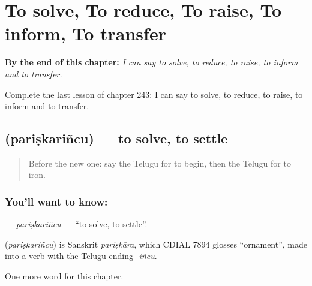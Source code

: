 
\chapter{To solve, To reduce, To raise, To inform, To transfer}
\label{ch:te-to-solve-to-reduce-to-raise-to-inform-to-transfer}

\begin{chapteropening}
\textbf{By the end of this chapter:} \emph{I can say to solve, to reduce, to raise, to inform and to transfer.}

Complete the last lesson of chapter 243: I can say to solve, to reduce, to raise, to inform and to transfer.
\end{chapteropening}

\section[\texorpdfstring{\te{పరిష్కరించు} (pariṣkariñcu)}{పరిష్కరించు (pariṣkariñcu)}]{ (pariṣkariñcu) — to solve, to settle}

\label{lesson:TE-C243-pariskarincu}



\begin{quote}
Before the new one: say the Telugu for to begin, then the Telugu for to iron.
\end{quote}

\subsection*{You'll want to know: }
\textbf{} — \emph{pariṣkariñcu} — \textquotedblleft{}to solve, to settle\textquotedblright{}.

\begin{cousinweb}
\textbf{} (\emph{pariṣkariñcu}) is Sanskrit \emph{pariṣkāra}, which CDIAL 7894 glosses \textquotedblleft{}ornament\textquotedblright{}, made into a verb with the Telugu ending \emph{-iñcu}.
\end{cousinweb}

\begin{grammarlens}[title={What you've built}]
One more word for this chapter.
\end{grammarlens}

